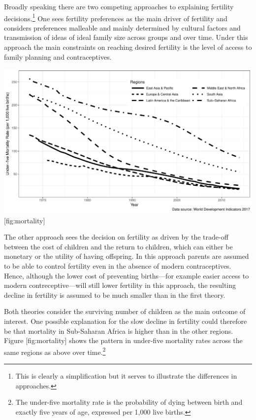 Broadly speaking there are two competing approaches to explaining fertility decisions.\footnote{This is clearly a simplification but it serves to illustrate the differences in approaches.} One sees fertility preferences as the main driver of fertility and considers preferences malleable and mainly determined by cultural factors and transmission of ideas of ideal family size across groups and over time. Under this approach the main constraints on reaching desired fertility is the level of access to family planning and contraceptives.

\includegraphics{../figures/childMortalityRatesBW.pdf} {[}fig:mortality{]}

The other approach sees the decision on fertility as driven by the trade-off between the cost of children and the return to children, which can either be monetary or the utility of having offspring. In this approach parents are assumed to be able to control fertility even in the absence of modern contraceptives. Hence, although the lower cost of preventing births---for example easier access to modern contreceptive---will still lower fertility in this approach, the resulting decline in fertility is assumed to be much smaller than in the first theory.

Both theories consider the surviving number of children as the main outcome of interest. One possible explanation for the slow decline in fertility could therefore be that mortality in Sub-Saharan Africa is higher than in the other regions. Figure {[}fig:mortality{]} shows the pattern in under-five mortality rates across the same regions as above over time.\footnote{The under-five mortality rate is the probability of dying between birth and exactly five years of age, expressed per 1,000 live births.}

